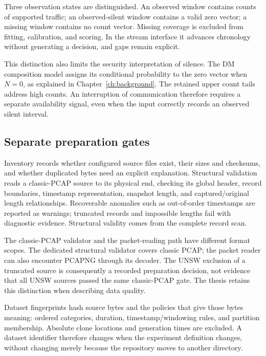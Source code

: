 Three observation states are distinguished. An observed window contains
counts of supported traffic; an observed-silent window contains a valid
zero vector; a missing window contains no count vector. Missing coverage is
excluded from fitting, calibration, and scoring. In the stream interface it
advances chronology without generating a decision, and gaps remain explicit.

This distinction also limits the security interpretation of silence.
The DM composition model assigns its conditional probability to the zero
vector when $N=0$, as explained in Chapter~\ref{ch:background}. The
retained upper count tails address high counts. An interruption of
communication therefore requires a separate availability signal, even when
the input correctly records an observed silent interval.

\subsection{Separate preparation gates}

Inventory records whether configured source files exist, their sizes and
checksums, and whether duplicated bytes need an explicit explanation.
Structural validation reads a classic-PCAP source to its physical end,
checking its global header, record boundaries, timestamp representation,
snapshot length, and captured/original length relationships. Recoverable
anomalies such as out-of-order timestamps are reported as warnings;
truncated records and impossible lengths fail with diagnostic evidence.
Structural validity comes from the complete record scan.

The classic-PCAP validator and the packet-reading path have different
format scopes. The dedicated structural validator covers classic PCAP;
the packet reader can also encounter PCAPNG through its decoder.
The UNSW exclusion of a truncated source is consequently a recorded
preparation decision, not evidence that all UNSW sources passed the same
classic-PCAP gate. The thesis retains this distinction when describing
data quality.

Dataset fingerprints hash source bytes and the policies that give those
bytes meaning: ordered categories, duration, timestamp/windowing rules,
and partition membership. Absolute clone locations and generation times
are excluded. A dataset identifier therefore changes when the experiment
definition changes, without changing merely because the repository moves
to another directory.

